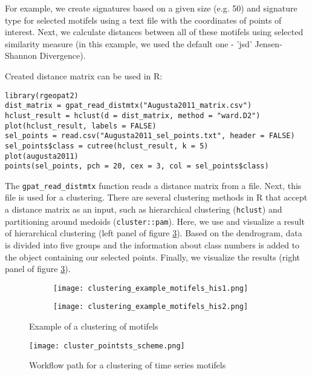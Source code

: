 For example, we create signatures based on a given size (e.g. 50) and signature type for selected motifels using a text file with the coordinates of points of interest.
Next, we calculate distances between all of these motifels using selected similarity measure (in this example, we used the default one - 'jsd' Jensen-Shannon Divergence).

Created distance matrix can be used in R:

\begin{minipage}{\linewidth}
\begin{lstlisting}
library(rgeopat2)
dist_matrix = gpat_read_distmtx("Augusta2011_matrix.csv")
hclust_result = hclust(d = dist_matrix, method = "ward.D2")
plot(hclust_result, labels = FALSE)
sel_points = read.csv("Augusta2011_sel_points.txt", header = FALSE) 
sel_points$class = cutree(hclust_result, k = 5)
plot(augusta2011)
points(sel_points, pch = 20, cex = 3, col = sel_points$class)
\end{lstlisting}
\end{minipage}

The {\tt gpat\_read\_distmtx} function reads a distance matrix from a file. 
Next, this file is used for a clustering. 
There are several clustering methods in R that accept a distance matrix as an input, such as hierarchical clustering ({\tt hclust}) and partitioning around medoids ({\tt cluster::pam}).
Here, we use and visualize a result of hierarchical clustering (left panel of figure \ref{FIG:CLUSTER_POINTS2}).
Based on the dendrogram, data is divided into five groups and the information about class numbers is added to the object containing our selected points.
Finally, we visualize the results (right panel of figure \ref{FIG:CLUSTER_POINTS2}).

\begin{figure}[H]
  \begin{subfigure}[b]{0.5\textwidth}
    \texttt{[image: clustering\_example\_motifels\_his1.png]}
    \label{FIG:CLUSTER_POINTS2a}
  \end{subfigure}
  \begin{subfigure}[b]{0.5\textwidth}
    \texttt{[image: clustering\_example\_motifels\_his2.png]}
    \label{FIG:CLUSTER_POINTS2b}
  \end{subfigure}
  \caption{Example of a clustering of motifels}
  \label{FIG:CLUSTER_POINTS2}
\end{figure}

\begin{figure}[H]
	\centering
	\texttt{[image: cluster\_pointsts\_scheme.png]}
	\caption{Workflow path for a clustering of time series motifels}
	\label{FIG:CLUSTER_POINTSTS}
\end{figure}

